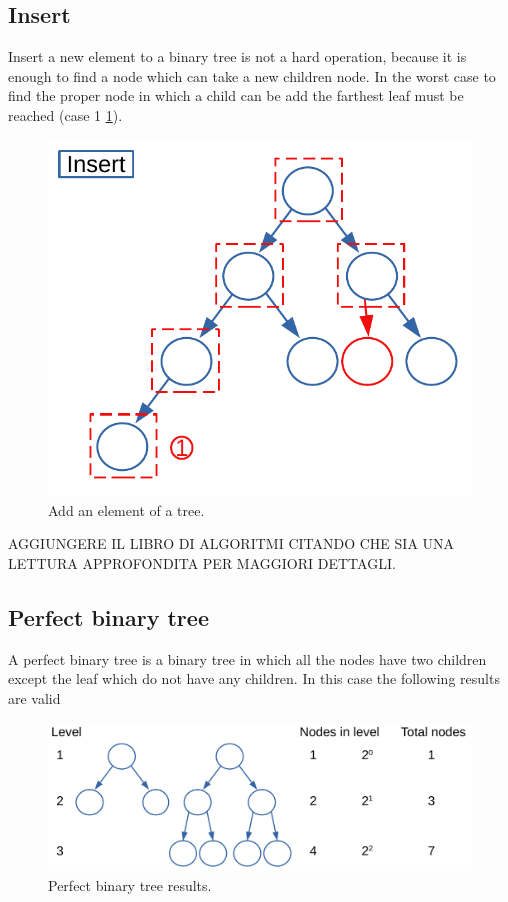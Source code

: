 \subsection{Insert}
Insert a new element to a binary tree is not a hard operation, because it is enough to find a node which can take a new children node. In the worst case to find the proper node in which a child can be add the farthest leaf must be reached (case 1 \ref{trees_10}).

\begin{figure}[H]
	\begin{center}
		\includegraphics[scale=.6]{chapters/trees/images/trees_10.pdf}
		\caption[Add an element of a tree.]{Add an element of a tree.}
		\label{trees_10}
	\end{center}
\end{figure}
AGGIUNGERE IL LIBRO DI ALGORITMI CITANDO CHE SIA UNA LETTURA APPROFONDITA PER MAGGIORI DETTAGLI.
\subsection{Perfect binary tree}
A perfect binary tree is a binary tree in which all the nodes have two children except the leaf which do not have any children. In this case the following results are valid

\begin{figure}[H]
	\begin{center}
		\includegraphics[scale=.6]{chapters/trees/images/trees_11.pdf}
		\caption[Perfect binary tree results.]{Perfect binary tree results.}
		\label{trees_11}
	\end{center}
\end{figure}

